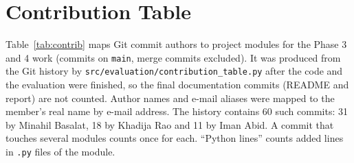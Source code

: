 \documentclass[11pt,a4paper]{article}
\begin{document}
\section{Contribution Table}
\label{sec:contrib}

Table~\ref{tab:contrib} maps Git commit authors to project modules for the Phase 3 and 4 work (commits on \texttt{main}, merge
commits excluded). It was produced from the Git history by \texttt{src/evaluation/\allowbreak contribution\_table.py} after the
code and the evaluation were finished, so the final documentation commits (README and report) are not counted. Author names and e-mail aliases were mapped to the member's real name by
e-mail address. The history contains 60 such commits: 31 by Minahil Basalat, 18 by Khadija Rao and
11 by Iman Abid. A commit that touches several modules counts once for each. ``Python lines'' counts added lines in
\texttt{.py} files of the module.
\end{document}
